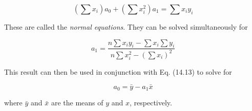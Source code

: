\documentclass[../main.tex]{subfiles}
\begin{document}
\begin{equation}
	\tag{14.14}
	\left( \sum x_i \right) a_0 + \left( \sum x_i^2 \right) a_1 = \sum x_i y_i
\end{equation}

\noindent These are called the \textit{normal equations}. They can be solved simultaneously for

\begin{equation}
	\tag{14.15}
	a_1 = \frac{n \sum x_i y_i - \sum x_i \sum y_i}{n \sum x^2_i - \left( \sum x_i \right) ^ 2}
\end{equation}

\noindent This result can then be used in conjunction with Eq. (14.13) to solve for

\begin{equation}
	\tag{14.16}
	a_0 = \bar{y} - a_1 \bar{x}
\end{equation}

\noindent where $\bar{y}$ and $\bar{x}$ are the means of $y$ and $x$, respectively.
\end{document}
